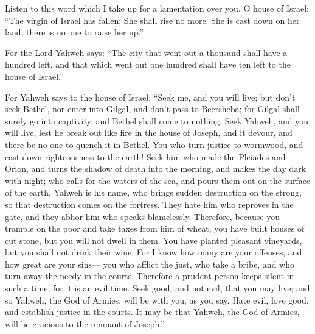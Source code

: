  Listen to this word which I take up for a lamentation
over you, O house of Israel:  ``The virgin of Israel has
fallen; She shall rise no more. She is cast down on her land; there is
no one to raise her up.''

 For the Lord Yahweh says: ``The city that went out a
thousand shall have a hundred left, and that which went out one hundred
shall have ten left to the house of Israel.''

 For Yahweh says to the house of Israel: ``Seek me, and
you will live;  but don't seek Bethel, nor enter into
Gilgal, and don't pass to Beersheba; for Gilgal shall surely go into
captivity, and Bethel shall come to nothing.  Seek Yahweh,
and you will live, lest he break out like fire in the house of Joseph,
and it devour, and there be no one to quench it in Bethel.
 You who turn justice to wormwood, and cast down
righteousness to the earth!  Seek him who made the
Pleiades and Orion, and turns the shadow of death into the morning, and
makes the day dark with night; who calls for the waters of the sea, and
pours them out on the surface of the earth, Yahweh is his name,
 who brings sudden destruction on the strong, so that
destruction comes on the fortress.  They hate him who
reproves in the gate, and they abhor him who speaks blamelessly.
 Therefore, because you trample on the poor and take
taxes from him of wheat, you have built houses of cut stone, but you
will not dwell in them. You have planted pleasant vineyards, but you
shall not drink their wine.  For I know how many are your
offenses, and how great are your sins--- you who afflict the just, who
take a bribe, and who turn away the needy in the courts. 
Therefore a prudent person keeps silent in such a time, for it is an
evil time.  Seek good, and not evil, that you may live;
and so Yahweh, the God of Armies, will be with you, as you say.
 Hate evil, love good, and establish justice in the
courts. It may be that Yahweh, the God of Armies, will be gracious to
the remnant of Joseph.''

